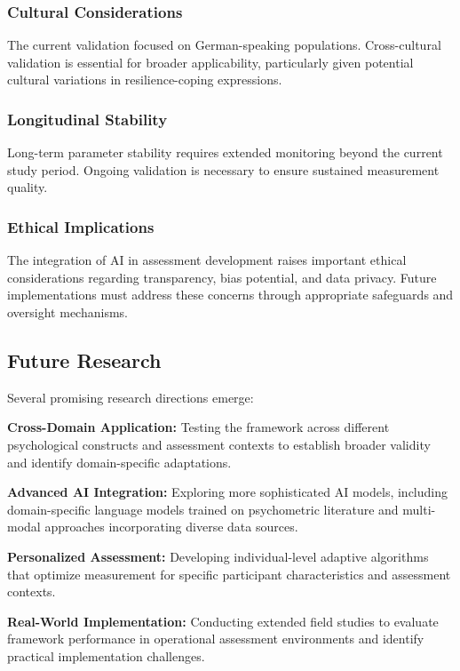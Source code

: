 \documentclass[12pt,a4paper]{article}
\begin{document}
\subsubsection{Cultural Considerations}
The current validation focused on German-speaking populations. Cross-cultural validation is essential for broader applicability, particularly given potential cultural variations in resilience-coping expressions.

\subsubsection{Longitudinal Stability}
Long-term parameter stability requires extended monitoring beyond the current study period. Ongoing validation is necessary to ensure sustained measurement quality.

\subsubsection{Ethical Implications}
The integration of AI in assessment development raises important ethical considerations regarding transparency, bias potential, and data privacy. Future implementations must address these concerns through appropriate safeguards and oversight mechanisms.

\subsection{Future Research}

Several promising research directions emerge:

\textbf{Cross-Domain Application:} Testing the framework across different psychological constructs and assessment contexts to establish broader validity and identify domain-specific adaptations.

\textbf{Advanced AI Integration:} Exploring more sophisticated AI models, including domain-specific language models trained on psychometric literature and multi-modal approaches incorporating diverse data sources.

\textbf{Personalized Assessment:} Developing individual-level adaptive algorithms that optimize measurement for specific participant characteristics and assessment contexts.

\textbf{Real-World Implementation:} Conducting extended field studies to evaluate framework performance in operational assessment environments and identify practical implementation challenges.
\end{document}
